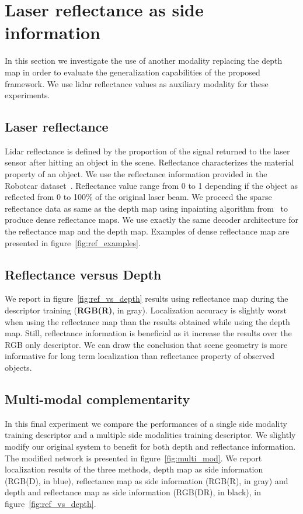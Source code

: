 \section{Laser reflectance as side information}

\label{sec:modality_ref}


In this section we investigate the use of another modality replacing the depth map in order to evaluate the generalization capabilities of the proposed framework. We use lidar reflectance values as auxiliary modality for these experiments.

\subsection{Laser reflectance}
Lidar reflectance is defined by the proportion of the signal returned to the laser sensor after hitting an object in the scene. Reflectance characterizes the material property of an object. We use the reflectance information provided in the Robotcar dataset~\cite{Maddern2016}. Reflectance value range from 0 to 1 depending if the object as reflected from 0 to 100\% of the original laser beam. We proceed the sparse reflectance data as same as the depth map using inpainting algorithm from~\cite{Bevilacqua2017} to produce dense reflectance maps. We use exactly the same decoder architecture for the reflectance map and the depth map. Examples of dense reflectance map are presented in figure~\ref{fig:ref_examples}.

\subsection{Reflectance versus Depth}
We report in figure~\ref{fig:ref_vs_depth} results using reflectance map during the descriptor training (\textbf{RGB(R)}, in gray). Localization accuracy is slightly worst when using the reflectance map than the results obtained while using the depth map. Still, reflectance information is beneficial as it increase the results over the RGB only descriptor. We can draw the conclusion that scene geometry is more informative for long term localization than reflectance property of observed objects.


\subsection{Multi-modal complementarity}
In this final experiment we compare the performances of a single side modality training descriptor and a multiple side modalities training descriptor. We slightly modify our original system to benefit for both depth and reflectance information. The modified network is presented in figure~\ref{fig:multi_mod}. We report localization results of the three methods, depth map as side information (RGB(D), in blue), reflectance map as side information (RGB(R), in gray) and depth and reflectance map as side information (RGB(DR), in black), in figure~\ref{fig:ref_vs_depth}.

